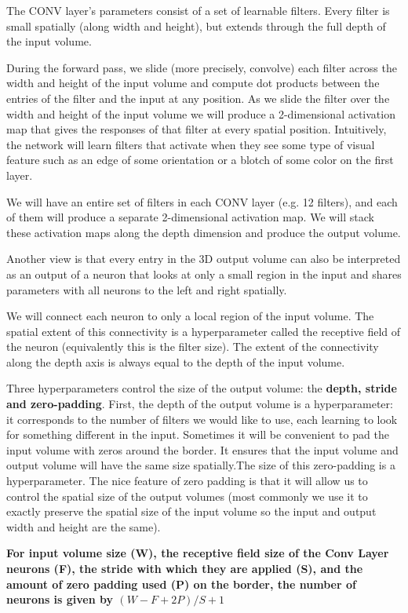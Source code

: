 \documentclass[letterpaper]{article}
\begin{document}
The CONV layer’s parameters consist of a set of learnable filters. Every filter is small spatially (along width and height), but extends through the full depth of the input volume. 

During the forward pass, we slide (more precisely, convolve) each filter across the width and height of the input volume and compute dot products between the entries of the filter and the input at any position. As we slide the filter over the width and height of the input volume we will produce a 2-dimensional activation map that gives the responses of that filter at every spatial position. Intuitively, the network will learn filters that activate when they see some type of visual feature such as an edge of some orientation or a blotch of some color on the first layer. 

We will have an entire set of filters in each CONV layer (e.g. 12 filters), and each of them will produce a separate 2-dimensional activation map. We will stack these activation maps along the depth dimension and produce the output volume.

Another view is that every entry in the 3D output volume can also be interpreted as an output of a neuron that looks at only a small region in the input and shares parameters with all neurons to the left and right spatially.

We will connect each neuron to only a local region of the input volume. The spatial extent of this connectivity is a hyperparameter called the receptive field of the neuron (equivalently this is the filter size). The extent of the connectivity along the depth axis is always equal to the depth of the input volume. 

Three hyperparameters control the size of the output volume: the \textbf{depth, stride and zero-padding}. First, the depth of the output volume is a hyperparameter: it corresponds to the number of filters we would like to use, each learning to look for something different in the input. Sometimes it will be convenient to pad the input volume with zeros around the border. It ensures that the input volume and output volume will have the same size spatially.The size of this zero-padding is a hyperparameter. The nice feature of zero padding is that it will allow us to control the spatial size of the output volumes (most commonly we use it to exactly preserve the spatial size of the input volume so the input and output width and height are the same).

\textbf{For input volume size (W), the receptive field size of the Conv Layer neurons (F), the stride with which they are applied (S), and the amount of zero padding used (P) on the border, the number of neurons is given by \((W-F+2P)/S + 1\)}
\end{document}
